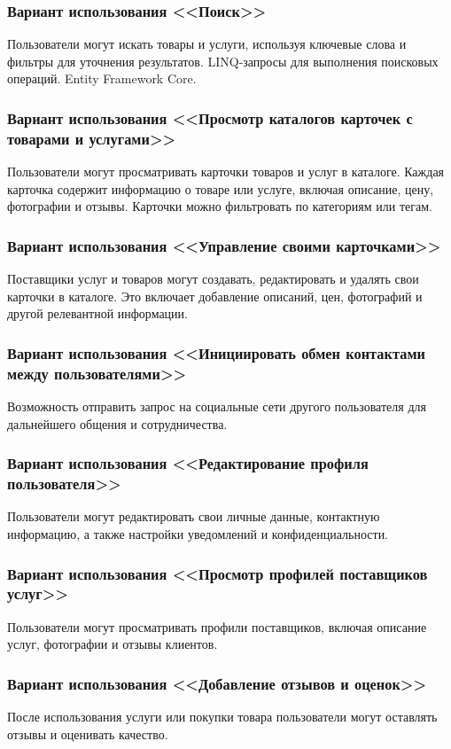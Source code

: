 \subsubsection{Вариант использования <<Поиск>>} 
Пользователи могут искать товары и услуги, используя ключевые слова и фильтры для уточнения результатов. LINQ-запросы для выполнения поисковых операций. Entity Framework Core.

\subsubsection{Вариант использования <<Просмотр каталогов карточек с товарами и услугами>>}
Пользователи могут просматривать карточки товаров и услуг в каталоге. Каждая карточка содержит информацию о товаре или услуге, включая описание, цену, фотографии и отзывы. Карточки можно фильтровать по категориям или тегам.

\subsubsection{Вариант использования <<Управление своими карточками>>}
Поставщики услуг и товаров могут создавать, редактировать и удалять свои карточки в каталоге. Это включает добавление описаний, цен, фотографий и другой релевантной информации.

\subsubsection{Вариант использования <<Инициировать обмен контактами между пользователями>>} 
Возможность отправить запрос на социальные сети другого пользователя для дальнейшего общения и сотрудничества.

\subsubsection{Вариант использования <<Редактирование профиля пользователя>>}
Пользователи могут редактировать свои личные данные, контактную информацию, а также настройки уведомлений и конфиденциальности.

\subsubsection{Вариант использования <<Просмотр профилей поставщиков услуг>>}
Пользователи могут просматривать профили поставщиков, включая описание услуг, фотографии и отзывы клиентов.

\subsubsection{Вариант использования <<Добавление отзывов и оценок>>}
После использования услуги или покупки товара пользователи могут оставлять отзывы и оценивать качество.

